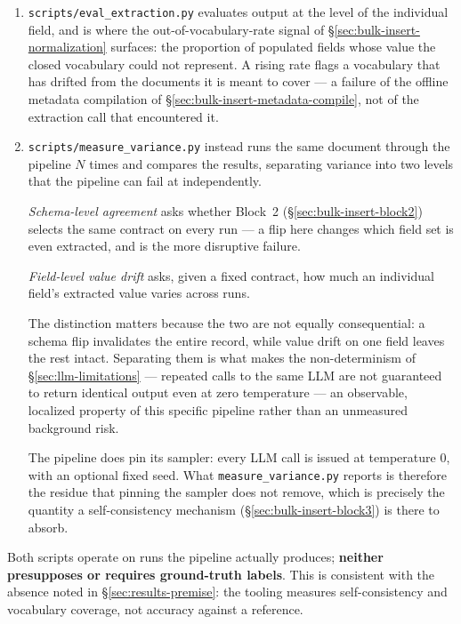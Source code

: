 \begin{enumerate}
\item \texttt{scripts/eval\_extraction.py} evaluates output at the level of the individual field, and is where the out-of-vocabulary-rate signal of \S\ref{sec:bulk-insert-normalization} surfaces: the proportion of populated fields whose value the closed vocabulary could not represent. A rising rate flags a vocabulary that has drifted from the documents it is meant to cover — a failure of the offline metadata compilation of \S\ref{sec:bulk-insert-metadata-compile}, not of the extraction call that encountered it.

\item \texttt{scripts/measure\_variance.py} instead runs the same document through the pipeline $N$ times and compares the results, separating variance into two levels that the pipeline can fail at independently. 

\emph{Schema-level agreement} asks whether Block~2 (\S\ref{sec:bulk-insert-block2}) selects the same contract on every run — a flip here changes which field set is even extracted, and is the more disruptive failure. 

\emph{Field-level value drift} asks, given a fixed contract, how much an individual field's extracted value varies across runs. 

The distinction matters because the two are not equally consequential: a schema flip invalidates the entire record, while value drift on one field leaves the rest intact. Separating them is what makes the non-determinism of \S\ref{sec:llm-limitations} — repeated calls to the same LLM are not guaranteed to return identical output even at zero temperature \citep{he2025defeating} — an observable, localized property of this specific pipeline rather than an unmeasured background risk. 

The pipeline does pin its sampler: every LLM call is issued at temperature 0, with an optional fixed seed. What \texttt{measure\_variance.py} reports is therefore the residue that pinning the sampler does not remove, which is precisely the quantity a self-consistency mechanism (\S\ref{sec:bulk-insert-block3}) is there to absorb.

\end{enumerate}

Both scripts operate on runs the pipeline actually produces; \textbf{neither presupposes or requires ground-truth labels}. This is consistent with the absence noted in \S\ref{sec:results-premise}: the tooling measures self-consistency and vocabulary coverage, not accuracy against a reference.


